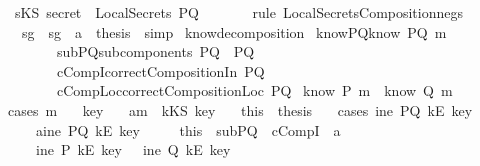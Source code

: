\begin{isabellebody}
\ \ {\isachardoublequoteopen}sKS\ secret\ {\isasymnotin}\ LocalSecrets\ PQ{\isachardoublequoteclose}\ \ \isanewline
\ \ \ \ \isamarkupfalse \ {\isacharparenleft}rule\ LocalSecretsComposition{\isacharunderscore}neg{}{\isacharunderscore}s{\isacharparenright}\isanewline
\ \ \isamarkupfalse \ sg{}\ \ sg{}\ \ a{}\ \isamarkupfalse \ {\isacharquery}thesis\ \isamarkupfalse \ simp\isanewline
{}\isamarkupfalse \endisatagproof
{\isafoldproof}\isadelimproof
\isanewline
\endisadelimproof
\isanewline
{}\isamarkupfalse \ know{\isacharunderscore}decomposition{\isacharcolon}\isanewline
{}\ knowPQ{\isacharcolon}{\isachardoublequoteopen}know\ PQ\ m{\isachardoublequoteclose}\isanewline
\ \ \ \ \ \ \ \ subPQ{\isacharcolon}{\isachardoublequoteopen}subcomponents\ PQ\ {\isacharequal}\ {\isacharbraceleft}P{\isacharcomma}Q{\isacharbraceright}{\isachardoublequoteclose}\ \isanewline
\ \ \ \ \ \ \ \ cCompI{\isacharcolon}{\isachardoublequoteopen}correctCompositionIn\ PQ{\isachardoublequoteclose}\isanewline
\ \ \ \ \ \ \ \ cCompLoc{\isacharcolon}{\isachardoublequoteopen}correctCompositionLoc\ PQ{\isachardoublequoteclose}\isanewline
{}\ {\isachardoublequoteopen}know\ P\ m\ {\isasymor}\ know\ Q\ m{\isachardoublequoteclose}\isanewline
\isadelimproof
\endisadelimproof
\isatagproof
{}\isamarkupfalse \ {\isacharparenleft}cases\ m{\isacharparenright}\isanewline
\ \ \isamarkupfalse \ key\isanewline
\ \ \isamarkupfalse \ a{}{\isacharcolon}{\isachardoublequoteopen}m\ {\isacharequal}\ kKS\ key{\isachardoublequoteclose}\isanewline
\ \ \isamarkupfalse \ this\ \isamarkupfalse \ {\isacharquery}thesis\isanewline
\ \ \isamarkupfalse \ {\isacharparenleft}cases\ {\isachardoublequoteopen}ine\ PQ\ {\isacharparenleft}kE\ key{\isacharparenright}{\isachardoublequoteclose}{\isacharparenright}\isanewline
\ \ \ \ \isamarkupfalse \ a{}{}{\isacharcolon}{\isachardoublequoteopen}ine\ PQ\ {\isacharparenleft}kE\ key{\isacharparenright}{\isachardoublequoteclose}\isanewline
\ \ \ \ \isamarkupfalse \ this\ \ subPQ\ \ cCompI\ \ a{}\ \isamarkupfalse \ \isanewline
\ \ \ \ \ {\isachardoublequoteopen}ine\ P\ {\isacharparenleft}kE\ key{\isacharparenright}\ \ {\isasymor}\ ine\ Q\ {\isacharparenleft}kE\ key{\isacharparenright}{\isachardoublequoteclose}\isanewline

\end{isabellebody}

